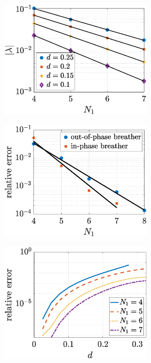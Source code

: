 \documentclass[12pt,reqno]{amsart}
\theoremstyle{definition}
\begin{document}
\begin{figure}
	\begin{center}
	\begin{subfigure}{0.45\linewidth}
		\caption{}
		\includegraphics[width=7.5cm]{doubleeigN.eps}
		\label{fig:eigerrora}
	\end{subfigure}
	\begin{subfigure}{0.45\linewidth}
		\caption{}
		\includegraphics[width=7.5cm]{doubleeigerrorN.eps} 
		\label{fig:eigerrorb} 
	\end{subfigure}
	\begin{subfigure}{0.45\linewidth}
		\caption{}
		\includegraphics[width=7.5cm]{doubleeigerrord.eps} \hspace{-0.5cm}
		\label{fig:eigerrorc} 
	\end{subfigure}
	\begin{subfigure}{0.45\linewidth}

\end{subfigure}
\end{center}
\end{figure}
\end{document}
